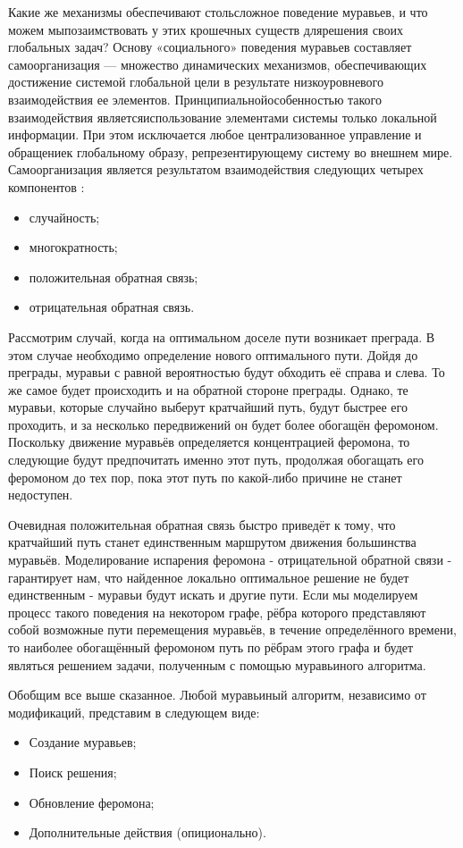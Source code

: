 \documentclass[a4paper, 14pt]{article}
\begin{document}
Какие же механизмы обеспечивают стольсложное поведение муравьев, и что можем мыпозаимствовать у этих крошечных существ длярешения своих глобальных задач? Основу «социального» поведения муравьев составляет самоорганизация — множество динамических механизмов, обеспечивающих достижение системой глобальной цели в результате низкоуровневого взаимодействия ее элементов. Принципиальнойособенностью такого взаимодействия являетсяиспользование элементами системы только локальной информации. При этом исключается любое централизованное управление и обращениек глобальному образу, репрезентирующему систему во внешнем мире. Самоорганизация является результатом взаимодействия следующих четырех компонентов \cite{shtovba} :
	\begin{itemize}
	\item случайность;
	\item многократность;
	\item положительная обратная связь;
	\item отрицательная обратная связь.
	\end{itemize}

Рассмотрим случай, когда на оптимальном доселе пути возникает преграда. В этом случае необходимо определение нового оптимального пути. Дойдя до преграды, муравьи с равной вероятностью будут обходить её справа и слева. То же самое будет происходить и на обратной стороне преграды. Однако, те муравьи, которые случайно выберут кратчайший путь, будут быстрее его проходить, и за несколько передвижений он будет более обогащён феромоном. Поскольку движение муравьёв определяется концентрацией феромона, то следующие будут предпочитать именно этот путь, продолжая обогащать его феромоном до тех пор, пока этот путь по какой-либо причине не станет недоступен.

Очевидная положительная обратная связь быстро приведёт к тому, что кратчайший путь станет единственным маршрутом движения большинства муравьёв. Моделирование испарения феромона - отрицательной обратной связи - гарантирует нам, что найденное локально оптимальное решение не будет единственным - муравьи будут искать и другие пути. Если мы моделируем процесс такого поведения на некотором графе, рёбра которого представляют собой возможные пути перемещения муравьёв, в течение определённого времени, то наиболее обогащённый феромоном путь по рёбрам этого графа и будет являться решением задачи, полученным с помощью муравьиного алгоритма.

Обобщим все выше сказанное. Любой муравьиный алгоритм, независимо от модификаций, представим в следующем виде:
\begin{itemize}
	\item Создание муравьев;
	\item Поиск решения;
	\item Обновление феромона;
	\item Дополнительные действия (опиционально).
\end{itemize}
\end{document}
